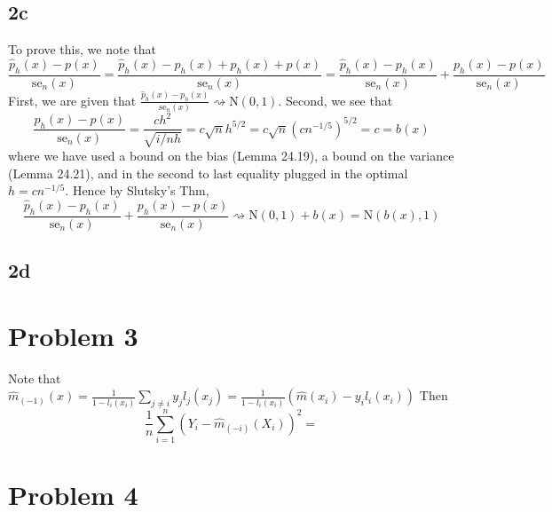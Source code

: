 \documentclass[12pt]{article}
\begin{document}
\subsection*{2c}
To prove this, we note that
\begin{equation}
    \frac{\hat{p}_h(x) - p(x)}{\text{se}_n(x)}
        = \frac{\hat{p}_h(x) - p_h(x) + p_h(x) + p(x)}{\text{se}_n(x)}
        = \frac{\hat{p}_h(x) - p_h(x)}{\text{se}_n(x)} + \frac{p_h(x) - p(x)}{\text{se}_n(x)}
\end{equation}
First, we are given that $\frac{\hat{p}_h(x) - p_h(x)}{\text{se}_n(x)} \rightsquigarrow \text{N}(0,1)$. Second, we see that
\begin{equation}
    \frac{p_h(x) - p(x)}{\text{se}_n(x)} = \frac{ch^2}{\sqrt{i/nh}} = c\sqrt{n}h^{5/2} = c\sqrt{n}\left(cn^{-1/5}\right)^{5/2} = c = b(x)
\end{equation}
where we have used a bound on the bias (Lemma 24.19), a bound on the variance (Lemma 24.21), and in the second to last 
equality plugged in the optimal $h = cn^{-1/5}$. Hence by Slutsky's Thm, 
\begin{equation}
    \frac{\hat{p}_h(x) - p_h(x)}{\text{se}_n(x)} + \frac{p_h(x) - p(x)}{\text{se}_n(x)}
    \rightsquigarrow \text{N}(0,1) + b(x) = \text{N}(b(x),1)
\end{equation}

\subsection*{2d}


\section*{Problem 3}
\label{sec:prob3}
Note that $\hat{m}_{(-1)}(x) = \frac{1}{1 - l_i(x_i)} \sum_{j \neq i}y_j l_j(x_j) = \frac{1}{1 - l_i(x_i)}\left( \hat{m}(x_i) - y_i l_i(x_i) \right)$
Then
\begin{equation}
    \frac{1}{n}\sum_{i=1}^n(Y_i - \hat{m}_{(-i)}(X_i))^2 = 
\end{equation}

\section*{Problem 4}
\label{sec:prob4}
\end{document}
